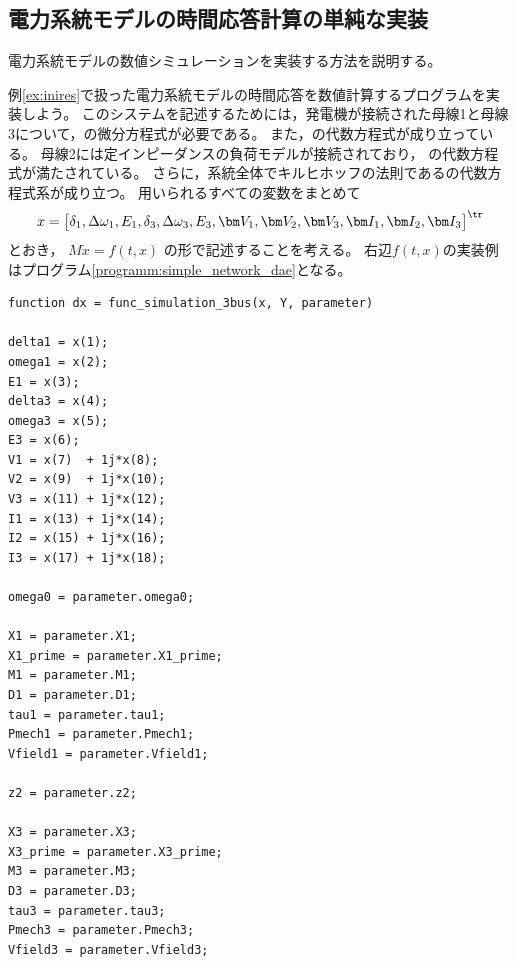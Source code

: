 \documentclass[tombow,dvipdfmx]{corona-a5-1.1}
\begin{document}
{\begin{例}[簡単な微分代数方程式の数値解法]
\end{例}


\subsection{電力系統モデルの時間応答計算の単純な実装}

電力系統モデルの数値シミュレーションを実装する方法を説明する。

\begin{例}[電力系統のシミュレーション]\label{ex:dae_ex2}
例\ref{ex:inires}で扱った電力系統モデルの時間応答を数値計算するプログラムを実装しよう。
このシステムを記述するためには，発電機が接続された母線1と母線3について，の微分方程式が必要である。
また，の代数方程式が成り立っている。
母線2には定インピーダンスの負荷モデルが接続されており，
の代数方程式が満たされている。
さらに，系統全体でキルヒホッフの法則であるの代数方程式系が成り立つ。
用いられるすべての変数をまとめて
\begin{align*}
x = \begin{bmatrix}
  \delta_1, \Delta\omega_1, E_1, \delta_3, \Delta\omega_3, E_3, \bm V_1, \bm V_2, \bm V_3, \bm I_1, \bm I_2, \bm I_3
\end{bmatrix}^\tr
\end{align*}
とおき，
$M\dot{x} = f(t, x)$
の形で記述することを考える。
右辺$f(t, x)$の実装例はプログラム\ref{programm:simple_network_dae}となる。

\begin{PROGRAMA}[count,title={func\_simulation\_3bus.m}]\label{programm:simple_network_dae}
\begin{verbatim}
function dx = func_simulation_3bus(x, Y, parameter)

delta1 = x(1);
omega1 = x(2);
E1 = x(3);
delta3 = x(4);
omega3 = x(5);
E3 = x(6);
V1 = x(7)  + 1j*x(8);
V2 = x(9)  + 1j*x(10);
V3 = x(11) + 1j*x(12);
I1 = x(13) + 1j*x(14);
I2 = x(15) + 1j*x(16);
I3 = x(17) + 1j*x(18);

omega0 = parameter.omega0;

X1 = parameter.X1;
X1_prime = parameter.X1_prime;
M1 = parameter.M1;
D1 = parameter.D1;
tau1 = parameter.tau1;
Pmech1 = parameter.Pmech1;
Vfield1 = parameter.Vfield1;

z2 = parameter.z2;

X3 = parameter.X3;
X3_prime = parameter.X3_prime;
M3 = parameter.M3;
D3 = parameter.D3;
tau3 = parameter.tau3;
Pmech3 = parameter.Pmech3;
Vfield3 = parameter.Vfield3;


\end{verbatim}
\end{PROGRAMA}
\end{例}}
\end{document}
